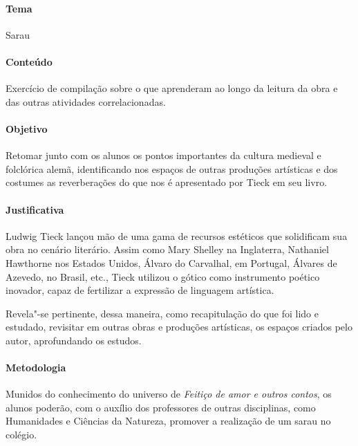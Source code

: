 \documentclass[12pt]{extarticle}
\begin{document}
\paragraph{Tema} Sarau 

\paragraph{Conteúdo} Exercício de compilação sobre o que aprenderam ao longo da leitura da obra e das outras 
atividades correlacionadas. 

\paragraph{Objetivo} Retomar junto com os alunos os pontos importantes da cultura medieval e folclórica alemã, identificando 
nos espaços de outras produções artísticas e dos costumes as reverberações do que nos 
é apresentado por Tieck em seu livro. 

\paragraph{Justificativa} Ludwig Tieck lançou mão de uma gama de recursos estéticos que
solidificam sua obra no cenário literário. Assim como Mary Shelley na
Inglaterra, Nathaniel Hawthorne nos Estados Unidos, Álvaro do Carvalhal,
em Portugal, Álvares de Azevedo, no Brasil, etc., Tieck utilizou o
gótico como instrumento poético inovador, capaz de fertilizar a
expressão de linguagem artística.

Revela"-se pertinente, dessa maneira, como recapitulação do que foi lido e estudado, revisitar em outras 
obras e produções artísticas, os espaços criados pelo autor, aprofundando os estudos.

\paragraph{Metodologia}
Munidos do conhecimento do universo de \emph{Feitiço de amor e outros contos}, os alunos
poderão, com o auxílio dos professores de outras disciplinas, como Humanidades e Ciências da Natureza, 
promover a realização de um sarau no colégio. 
\end{document}
